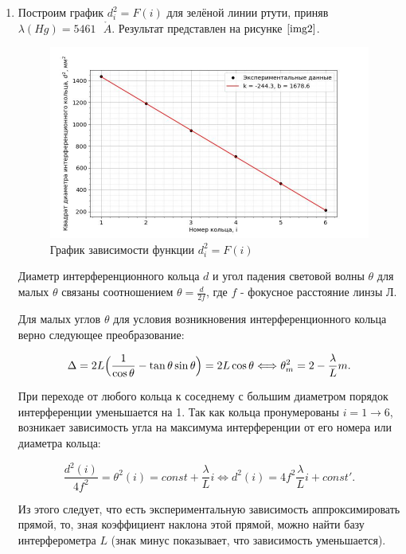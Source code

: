 \documentclass[a4paper,12pt]{article} %
\begin{document}
\begin{enumerate}
    \item Построим график $d^2_i=F(i)$ для зелёной линии ртути, приняв $\lambda(Hg)=5461 \text{ } \mathring A$. Результат представлен на рисунке $\ref{img2}$.

    \begin{figure}[h]
    \begin{center}
        \includegraphics[width=16cm]{image1.jpg}
    \end{center}
        \caption{График зависимости функции $d^2_i=F(i)$}
        \label{img2}
    \end{figure}

    Диаметр интерференционного кольца $d$ и угол падения световой волны $\theta$ для малых $\theta$ связаны соотношением $\theta=\frac{d}{2f}$, где $f$ - фокусное расстояние линзы $\text{Л}$.

    Для малых углов $\theta$ для условия возникновения интерференционного кольца верно следующее преобразование:

    \[ \Delta = 2L\Bigl(\frac{1}{\cos{\theta}} -\tan{\theta}\sin{\theta} \Bigr)=2L\cos{\theta} \Longleftrightarrow \theta^2_m = 2-\frac{\lambda}{L}m. \]

    При переходе от любого кольца к соседнему с большим диаметром порядок интерференции уменьшается на 1. Так как кольца пронумерованы $i=1\rightarrow6$, возникает зависимость угла на максимума интерференции от его номера или диаметра кольца:

    \[ \frac{d^2(i)}{4f^2}=\theta^2(i)=const + \frac{\lambda}{L}i \Longleftrightarrow d^2(i) = 4f^2\frac{\lambda}{L}i+const'. \]

    Из этого следует, что есть экспериментальную зависимость аппроксимировать прямой, то, зная коэффициент наклона этой прямой, можно найти базу интерферометра $L$ (знак минус показывает, что зависимость уменьшается).


\end{enumerate}
\end{document}
